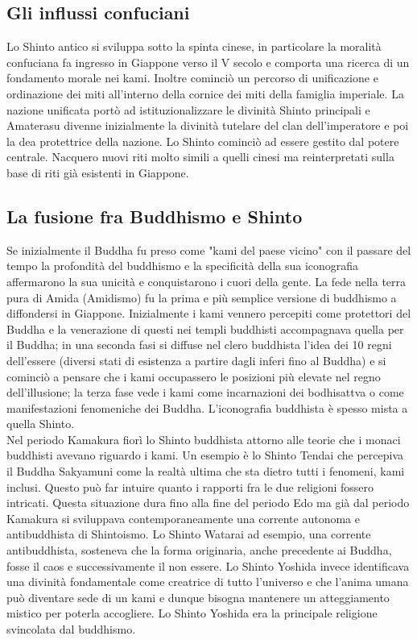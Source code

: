 \documentclass[10pt,a4paper]{report}
\begin{document}
\subsection{Gli influssi confuciani}
Lo Shinto antico si sviluppa sotto la spinta cinese, in particolare la moralità confuciana fa ingresso in Giappone verso il V secolo e comporta una ricerca di un fondamento morale nei kami. Inoltre cominciò un percorso di unificazione e ordinazione dei miti all'interno della cornice dei miti della famiglia imperiale. La nazione unificata portò ad istituzionalizzare le divinità Shinto principali e Amaterasu divenne inizialmente la divinità tutelare del clan dell'imperatore e poi la dea protettrice della nazione. Lo Shinto cominciò ad essere gestito dal potere centrale. Nacquero nuovi riti molto simili a quelli cinesi ma reinterpretati sulla base di riti già esistenti in Giappone. 
\subsection{La fusione fra Buddhismo e Shinto}
Se inizialmente il Buddha fu preso come "kami del paese vicino" con il passare del tempo la profondità del buddhismo e la specificità della sua iconografia affermarono la sua unicità e conquistarono i cuori della gente. La fede nella terra pura di Amida (Amidismo) fu la prima e più semplice versione di buddhismo a diffondersi in Giappone. Inizialmente i kami vennero percepiti come protettori del Buddha e la venerazione di questi nei templi buddhisti accompagnava quella per il Buddha; in una seconda fasi si diffuse nel clero buddhista l'idea dei 10 regni dell'essere (diversi stati di esistenza a partire dagli inferi fino al Buddha) e si cominciò a pensare che i kami occupassero le posizioni più elevate nel regno dell'illusione; la terza fase vede i kami come incarnazioni dei bodhisattva o come manifestazioni fenomeniche dei Buddha. L'iconografia buddhista è spesso mista a quella Shinto.\\
Nel periodo Kamakura fiorì lo Shinto buddhista attorno alle teorie che i monaci buddhisti avevano riguardo i kami. Un esempio è lo Shinto Tendai che percepiva il Buddha Sakyamuni come la realtà ultima che sta dietro tutti i fenomeni, kami inclusi. Questo può far intuire quanto i rapporti fra le due religioni fossero intricati. Questa situazione dura fino alla fine del periodo Edo ma già dal periodo Kamakura si sviluppava contemporaneamente una corrente autonoma e antibuddhista di Shintoismo. Lo Shinto Watarai ad esempio, una corrente antibuddhista, sosteneva che la forma originaria, anche precedente ai Buddha, fosse il caos e successivamente il non essere. Lo Shinto Yoshida invece identificava una divinità fondamentale come creatrice di tutto l'universo e che l'anima umana può diventare sede di un kami e dunque bisogna mantenere un atteggiamento mistico per poterla accogliere. Lo Shinto Yoshida era la principale religione svincolata dal buddhismo.
\end{document}
